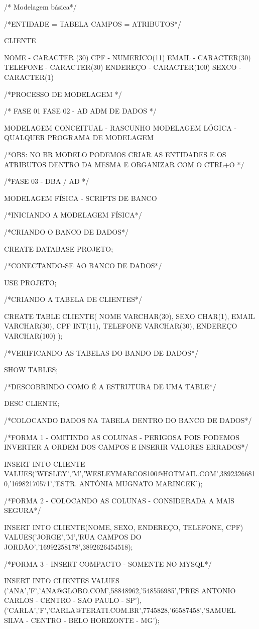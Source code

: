 /* Modelagem básica*/

/*ENTIDADE = TABELA
CAMPOS = ATRIBUTOS*/

CLIENTE

NOME - CARACTER (30)
CPF - NUMERICO(11)
EMAIL - CARACTER(30)
TELEFONE - CARACTER(30)
ENDEREÇO - CARACTER(100)
SEXCO - CARACTER(1)

/*PROCESSO DE MODELAGEM */

/* FASE 01 FASE 02 - AD ADM DE DADOS */

MODELAGEM CONCEITUAL - RASCUNHO
MODELAGEM LÓGICA - QUALQUER PROGRAMA DE MODELAGEM

/*OBS: NO BR MODELO PODEMOS CRIAR AS ENTIDADES E OS ATRIBUTOS DENTRO DA MESMA
E ORGANIZAR COM O CTRL+O */

/*FASE 03 - DBA / AD */

MODELAGEM FÍSICA - SCRIPTS DE BANCO

/*INICIANDO A MODELAGEM FÍSICA*/

/*CRIANDO O BANCO DE DADOS*/

CREATE DATABASE PROJETO;

/*CONECTANDO-SE AO BANCO DE DADOS*/

USE PROJETO;

/*CRIANDO A TABELA DE CLIENTES*/

CREATE TABLE CLIENTE(
	NOME VARCHAR(30),
	SEXO CHAR(1),
	EMAIL VARCHAR(30),
	CPF INT(11),
	TELEFONE VARCHAR(30),
	ENDEREÇO VARCHAR(100)
);

/*VERIFICANDO AS TABELAS DO BANDO DE DADOS*/

SHOW TABLES;

/*DESCOBRINDO COMO É A ESTRUTURA DE UMA TABLE*/

DESC CLIENTE;

/*COLOCANDO DADOS NA TABELA DENTRO DO BANCO DE DADOS*/

/*FORMA 1 - OMITINDO AS COLUNAS - PERIGOSA POIS PODEMOS INVERTER A ORDEM DOS CAMPOS E INSERIR VALORES ERRADOS*/

INSERT INTO CLIENTE VALUES('WESLEY','M','WESLEYMARCOS100@HOTMAIL.COM',38923266810,'16982170571','ESTR. ANTÔNIA MUGNATO MARINCEK');

/*FORMA 2 - COLOCANDO AS COLUNAS - CONSIDERADA A MAIS SEGURA*/

INSERT INTO CLIENTE(NOME, SEXO, ENDEREÇO, TELEFONE, CPF) VALUES('JORGE','M','RUA CAMPOS DO JORDÃO','16992258178',3892626454518);

/*FORMA 3 - INSERT COMPACTO - SOMENTE NO MYSQL*/

INSERT INTO CLIENTES VALUES
	('ANA','F','ANA@GLOBO.COM',58848962,'548556985','PRES ANTONIO CARLOS - CENTRO - SAO PAULO - SP'),
	('CARLA','F','CARLA@TERATI.COM.BR',7745828,'66587458','SAMUEL SILVA - CENTRO - BELO HORIZONTE - MG');
	



